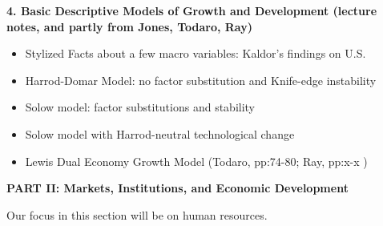 \documentclass[11pt,pdftex]{article}
\begin{document}
\begin{description}
\item  \textbf{4. Basic Descriptive Models of Growth and Development
(lecture notes, and partly from Jones, Todaro, Ray)}

\begin{itemize}
\item  Stylized Facts about a few macro variables: Kaldor's findings on U.S.

\item  Harrod-Domar Model: no factor substitution and Knife-edge instability

\item  Solow model: factor substitutions and stability

\item  Solow model with Harrod-neutral technological change

\item  Lewis Dual Economy Growth Model (Todaro, pp:74-80; Ray, pp:x-x )
\end{itemize}
\end{description}

\textbf{PART II: Markets, Institutions, and Economic Development}

Our focus in this section will be on human resources. 
\end{document}
